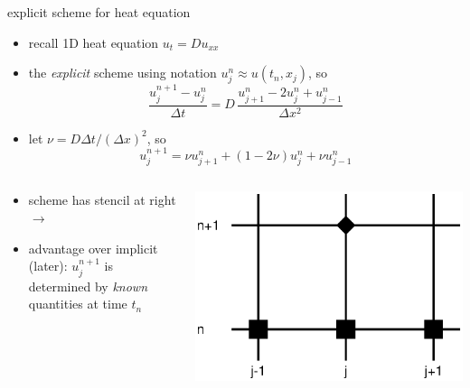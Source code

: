 \begin{frame}{explicit scheme for heat equation}
\label{slide:explicit}

\begin{itemize}
\item recall 1D heat equation $u_t = D u_{xx}$
\item the \emph{explicit} scheme using notation $u_j^n \approx u(t_n,x_j)$, so
	$$\frac{u_j^{n+1} - u_j^n}{\Delta t} = D\,\frac{u_{j+1}^n - 2 u_j^n + u_{j-1}^n}{\Delta x^2}$$
\item let $\nu = D \Delta t / (\Delta x)^2$, so
	$$u_j^{n+1} = \nu u_{j+1}^n + (1 - 2 \nu) u_j^n + \nu u_{j-1}^n$$
\end{itemize}

\begin{columns}[b]
\begin{column}{0.70\textwidth}
\begin{itemize}
\item scheme has stencil at right \large $\to$ \normalsize
\item advantage over implicit (later): $u_j^{n+1}$ is determined by \emph{known} quantities at time $t_n$
\bigskip
\end{itemize}
\end{column}
\begin{column}{0.3\textwidth}
\includegraphics[width=1.0\textwidth]{pdffigs/expstencil}
\end{column}
\end{columns}
\end{frame}


